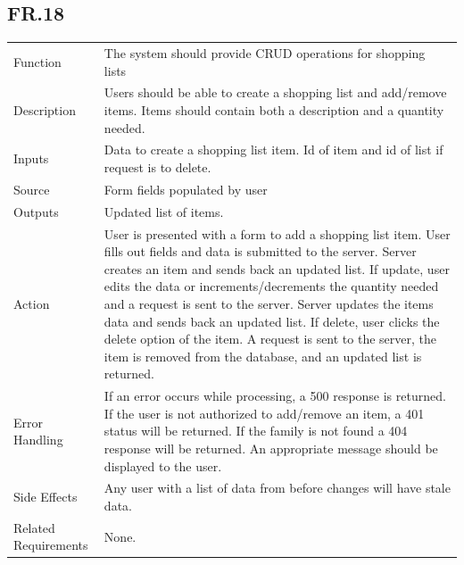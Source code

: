 \documentclass[12pt]{article}
\begin{document}
    \subsection*{FR.18}
    \begin{center}
        \begin{tabular}{| p{10em} p{26em} |}
        \hline
         Function & The system should provide CRUD operations for shopping lists\\
         Description & Users should be able to create a shopping list and add/remove items. 
         Items should contain both a description and a quantity needed.\\
         Inputs & Data to create a shopping list item. Id of item and id of list if request is to delete.\\
         Source & Form fields populated by user\\
         Outputs & Updated list of items.\\
         Action & User is presented with a form to add a shopping list item. User fills out fields and data
         is submitted to the server. Server creates an item and sends back an updated list. If update, user
         edits the data or increments/decrements the quantity needed and a request is sent to the server. Server updates the items data and sends back an updated list. If delete, user clicks the delete option of the item. A request is sent to the server, the item is removed from the database, and an updated list is returned.\\
         Error Handling & If an error occurs while processing, a 500 response is returned. If the user is not authorized to add/remove an item, a 401 status will be returned. If the family is not found a 404 response will be returned. An appropriate message should be displayed to the user.\\
         Side Effects & Any user with a list of data from before changes will have stale data.\\
         Related Requirements & None.\\
         \hline
        \end{tabular}
    \end{center}
\end{document}
